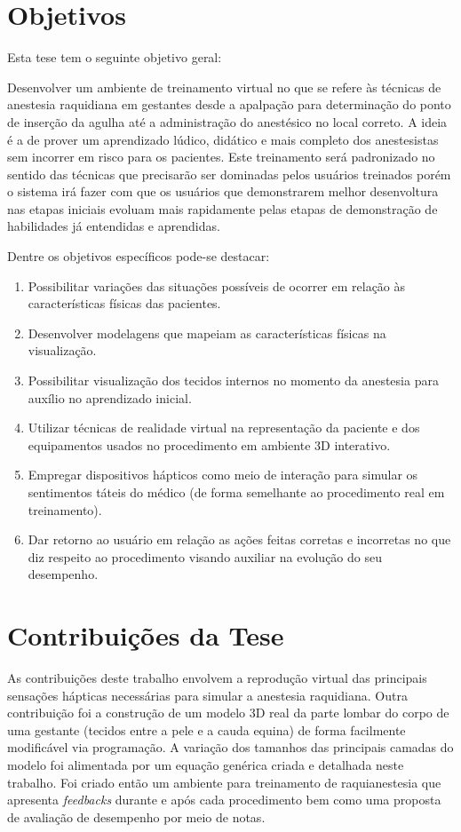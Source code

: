 \section{Objetivos}
\label{sec:objetivos}

Esta tese tem o seguinte objetivo geral:

Desenvolver um ambiente de treinamento virtual no que se refere às técnicas de anestesia raquidiana em gestantes desde a apalpação para determinação do ponto de inserção da agulha até a administração do anestésico no local correto. A ideia é a de prover um aprendizado lúdico, didático e mais completo dos anestesistas sem incorrer em risco para os pacientes. Este treinamento será padronizado no sentido das técnicas que precisarão ser dominadas pelos usuários treinados porém o sistema irá fazer com que os usuários que demonstrarem melhor desenvoltura nas etapas iniciais evoluam mais rapidamente pelas etapas de demonstração de habilidades já entendidas e aprendidas. 

Dentre os objetivos específicos pode-se destacar:
\begin{enumerate}
\item Possibilitar variações das situações possíveis de ocorrer em relação às características físicas das pacientes. 
\item Desenvolver modelagens que mapeiam as características físicas na visualização. 
\item Possibilitar visualização dos tecidos internos no momento da anestesia para auxílio no aprendizado inicial. 
\item Utilizar técnicas de realidade virtual na representação da paciente e dos equipamentos usados no procedimento em ambiente 3D interativo.
\item Empregar dispositivos hápticos como meio de interação para simular os sentimentos táteis do médico (de forma semelhante ao procedimento real em treinamento). 
\item Dar retorno ao usuário em relação as ações feitas corretas e incorretas no que diz respeito ao procedimento visando auxiliar na evolução do seu desempenho.
\end{enumerate}

\section{Contribuições da Tese}
\label{sec:contribuicoes}

As contribuições deste trabalho envolvem a reprodução virtual das principais sensações hápticas necessárias para simular a anestesia raquidiana. Outra contribuição foi a construção de um modelo 3D real da parte lombar do corpo de uma gestante (tecidos entre a pele e a cauda equina) de forma facilmente modificável via programação. A variação dos tamanhos das principais camadas do modelo foi alimentada por um equação genérica criada e detalhada neste trabalho. Foi criado então um ambiente para treinamento de raquianestesia que apresenta \textit{feedbacks} durante e após cada
procedimento bem como uma proposta de avaliação de desempenho por meio de notas.

